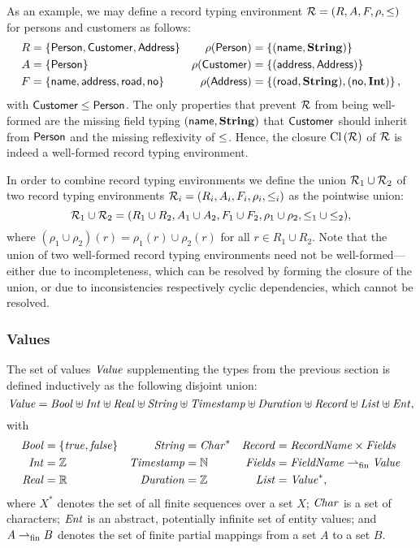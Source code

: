 \begin{example}
  \label{ex:recClosure}
  As an example, we may define a record typing environment ${\mathcal R} =
  (R,A,F,\rho,\le)$ for persons and customers as follows:
  \begin{align*}
    R &=
    \left\{\mathsf{Person}, \mathsf{Customer},
      \mathsf{Address}\right\} & \rho(\mathsf{Person}) &=
    \left\{(\mathsf{name},\mathbf{String})\right\}\\
    A &= \left\{\mathsf{Person}\right\} & \rho(\mathsf{Customer}) &=
    \left\{(\mathsf{address},\mathsf{Address})\right\}\\
    F &= \left\{\mathsf{name}, \mathsf{address}, \mathsf{road},
      \mathsf{no}\right\} & \rho(\mathsf{Address}) &=
    \left\{(\mathsf{road},\mathbf{String}),(\mathsf{no},\mathbf{Int})\right\},
  \end{align*}
  with $\mathsf{Customer} \le \mathsf{Person}$.  The only
  properties that prevent ${\mathcal R}$ from being well-formed are the missing field typing
  $(\mathsf{name},\mathbf{String})$ that $\mathsf{Customer}$ should
  inherit from $\mathsf{Person}$ and the missing reflexivity of
  $\le$. Hence, the closure $\mathrm{Cl}\left({\mathcal R}\right)$ of ${\mathcal R}$ is indeed a
  well-formed record typing environment.
\end{example}

In order to combine record typing environments we define the
union ${\mathcal R}_1 \cup {\mathcal R}_2$ of two record typing environments
${\mathcal R}_i=(R_i,A_i,F_i,\rho_i,\le_i)$ as the pointwise union:
\[
{\mathcal R}_1 \cup {\mathcal R}_2 = (R_1\cup R_2 ,A_1\cup A_2,F_1\cup
F_2,\rho_1\cup \rho_2,{\le_1}\cup{\le_2}),
\]
where $(\rho_1\cup \rho_2)(r) = \rho_1(r)\cup \rho_2(r)$ for all $r
\in R_1\cup R_2$. Note that the union of two well-formed record typing
environments need not be well-formed---either due to incompleteness, which
can be resolved by forming the closure of the union, or due to
inconsistencies respectively cyclic dependencies, which cannot be
resolved.

\subsubsection{Values}
\label{sec:values}

The set of values $\mathit{Value}$ supplementing the types from the
previous section is defined inductively as the following disjoint
union:
\[
\mathit{Value} = \mathit{Bool} \uplus \mathit{Int} \uplus \mathit{Real} \uplus \mathit{String} \uplus
\mathit{Timestamp} \uplus \mathit{Duration} \uplus \mathit{Record} \uplus \mathit{List} \uplus \mathit{Ent},
\]
with
\begin{align*}
  \mathit{Bool} &= \{\mathit{true},\mathit{false}\} & \mathit{String} &= \mathit{Char}^* &
  \mathit{Record} &= \mathit{RecordName} \times \mathit{Fields}\\
  \mathit{Int} &= \mathbb{Z} & \mathit{Timestamp} &= \mathbb{N} & \mathit{Fields} &=
  \mathit{FieldName} \rightharpoonup_{\mathrm{fin}} \mathit{Value}\\
  \mathit{Real} &= \mathbb{R} & \mathit{Duration} &= \mathbb{Z} & \mathit{List} &=
  \mathit{Value}^*,
\end{align*}
where $X^*$ denotes the set of all finite sequences over a set $X$;
$\mathit{Char}$ is a set of characters; $\mathit{Ent}$ is an abstract, potentially
infinite set of entity values; and $A \rightharpoonup_{\mathrm{fin}} B$ denotes the set of
finite partial mappings from a set $A$ to a set $B$.

